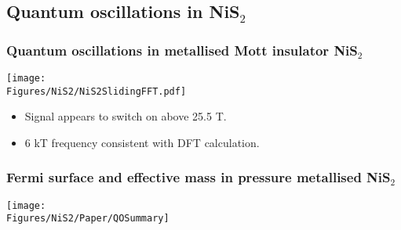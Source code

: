 \subsection{Quantum oscillations in NiS$_2$}

\begin{frame}[label=QONiS2]
\frametitle{Quantum oscillations in metallised Mott insulator NiS$_2$}
\centerline{\texttt{[image: \\Figures/NiS2/NiS2SlidingFFT.pdf]}}

\begin{itemize}
\item Signal appears to switch on above 25.5 T. 
\item 6 kT frequency consistent with DFT calculation. %
\end{itemize}
\end{frame}

\begin{frame}[label=NiS2Mass]
  \frametitle{Fermi surface and effective mass in pressure metallised NiS$_2$}
\centerline{\texttt{[image: \\Figures/NiS2/Paper/QOSummary]}}
\end{frame}

